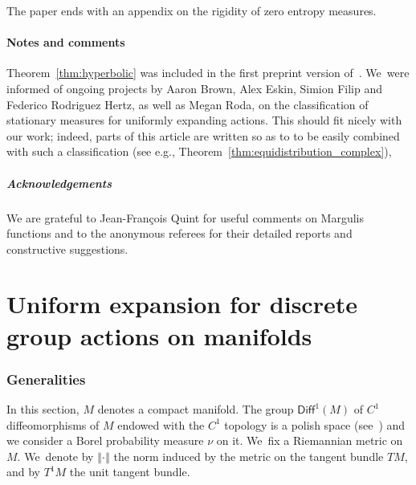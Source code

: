 \documentclass[11pt]{article}
\newcommand{\eg}{e.g.,\xspace}
\newcommand{\norm}[1]{{\left\Vert#1\right\Vert}}
\newcommand\Diff{{\mathsf{Diff}}}
\theoremstyle{plain}
\theoremstyle{definition}
\numberwithin{equation}{section}
\begin{document}
The paper ends with an appendix on the rigidity of zero entropy measures.\enlargethispage{.5\baselineskip}

\subsection{Notes and comments} Theorem~\ref{thm:hyperbolic} was included in the first preprint version
of~\cite{stiffness}. We~were informed of ongoing projects by Aaron Brown, Alex Eskin,
Simion Filip and Federico Rodriguez Hertz, as well as Megan Roda,
on the classification of stationary measures for uniformly expanding actions.
This should fit nicely with our work; indeed, parts of this article are written so as to to be easily combined with such a classification (see \eg Theorem~\ref{thm:equidistribution_complex}),

\subsubsection*{Acknowledgements}
We are grateful to Jean-François Quint for useful comments on Margulis functions and to
the anonymous referees for their detailed reports and constructive suggestions.

\part{Uniform expansion for discrete group actions on manifolds}

\section{Generalities}\label{sec:uniform_generalities}

In this section, $M$ denotes a compact manifold. The group $\Diff^1(M)$
of $C^1$ diffeomorphisms of $M$ endowed with the $C^1$ topology is a polish space (see~\cite{rosendal:book}) and we consider a Borel
probability measure $\nu$ on it. We~fix a Riemannian metric on $M$. We~denote by $\norm{\cdot}$
the norm induced by the metric on the tangent bundle $TM$, and by $T^1M$ the unit tangent bundle.
\end{document}
